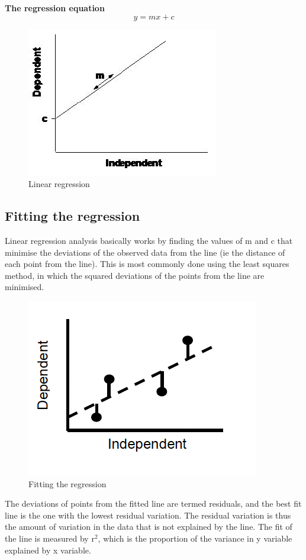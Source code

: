 \documentclass[
]{book}
\begin{document}
\textbf{The regression equation}
\[
y=mx+c
\]

\begin{figure}
\includegraphics[width=0.4\linewidth]{figures/regression} \caption{Linear regression}\label{fig:unnamed-chunk-57}
\end{figure}

\hypertarget{fitting-the-regression}{%
\subsection*{Fitting the regression}\label{fitting-the-regression}}

Linear regression analysis basically works by finding the values of m and c that minimise the deviations of the observed data from the line (ie the distance of each point from the line). This is most commonly done using the least squares method, in which the squared deviations of the points from the line are minimised.

\begin{figure}
\includegraphics[width=0.4\linewidth]{figures/residuals} \caption{Fitting the regression}\label{fig:unnamed-chunk-58}
\end{figure}

The deviations of points from the fitted line are termed residuals, and the best fit line is the one with the lowest residual variation. The residual variation is thus the amount of variation in the data that is not explained by the line. The fit of the line is measured by r\(^2\), which is the proportion of the variance in y variable explained by x variable.
\end{document}

